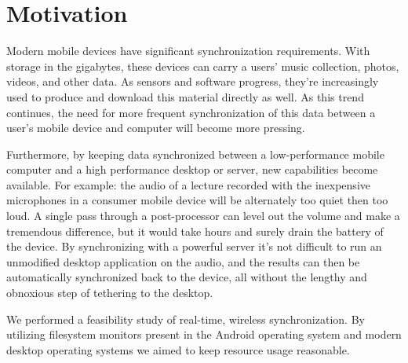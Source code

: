 \section{Motivation}
\label{sec:Motivation}
Modern mobile devices have significant synchronization requirements.  With storage in the gigabytes, these devices can carry a users' music collection, photos, videos, and other data.  As sensors and software progress, they're increasingly used to produce and download this material directly as well.  As this trend continues, the need for more frequent synchronization of this data between a user's mobile device and computer will become more pressing.

Furthermore, by keeping data synchronized between a low-performance mobile computer and a high performance desktop or server, new capabilities become available.  For example: the audio of a lecture recorded with the inexpensive microphones in a consumer mobile device will be alternately too quiet then too loud.  A single pass through a post-processor can level out the volume and make a tremendous difference, but it would take hours and surely drain the battery of the device.  By synchronizing with a powerful server it's not difficult to run an unmodified desktop application on the audio, and the results can then be automatically synchronized back to the device, all without the lengthy and obnoxious step of tethering to the desktop.

We performed a feasibility study of real-time, wireless synchronization.  By utilizing filesystem monitors present in the Android operating system and modern desktop operating systems we aimed to keep resource usage reasonable.